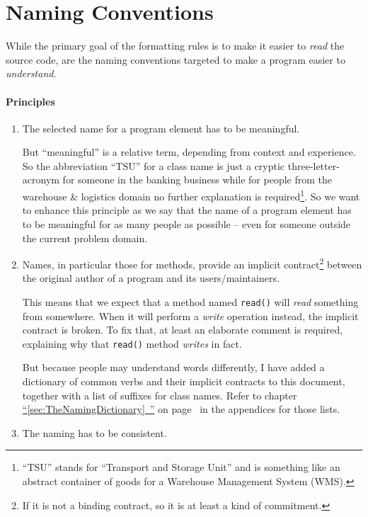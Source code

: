 \documentclass[11pt,a4paper, titlepage, parskip=half, headsepline, footsepline, cleardoublepage=current, headheight=1cm]{scrbook}
\newcommand*{\tqfullvref}[1]{\hyperref[{#1}]{“\ref*{#1}~\nameref*{#1}”} on page~\pageref{#1}}
\begin{document}
\chapter{Naming Conventions}\label{sec:NamingConventions}
While the primary goal of the formatting rules is to make it easier to \textit{read} the source code, are the naming conventions targeted to make a program easier to \textit{understand}.

\subsubsection{Principles}
\begin{enumerate}[label=P\arabic*.]
\item{The selected name for a program element has to be meaningful.

But “meaningful” is a relative term, depending from context and experience. So the abbreviation “TSU” for a class name is just a cryptic three-letter-acronym for someone in the banking business while for people from the warehouse \& logistics domain no further explanation is required\footnote{“TSU” stands for “Transport and Storage Unit” and is something like an abstract container of goods for a Warehouse Management System (WMS).}. So we want to enhance this principle as we say that the name of a program element has to be meaningful for as many people as possible – even for someone outside the current problem domain.}\label{p:MeaningfulNames}

\item{Names, in particular those for methods, provide an implicit contract\footnote{If it is not a binding contract, so it is at least a kind of commitment.} between the original author of a program and its users/maintainers.

This means that we expect that a method named \lstinline|read()| will \textit{read} something from somewhere. When it will perform a \textit{write} operation instead, the implicit contract is broken. To fix that, at least an elaborate comment is required, explaining why that \lstinline|read()| method \textit{writes} in fact.

But because people may understand words differently, I have added a dictionary of common verbs and their implicit contracts to this document, together with a list of suffixes for class names. Refer to chapter \tqfullvref{sec:TheNamingDictionary} in the appendices for those lists.}\label{p:NamesAsConctract}

\item{The naming has to be consistent.

}
\end{enumerate}
\end{document}
